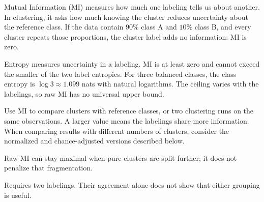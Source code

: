 \clearpage
\thispagestyle{clusteringstyle}
\label{sec:mutual-info-score}

Mutual Information (MI) measures how much one labeling tells us about another. In clustering, it asks how much knowing the cluster reduces uncertainty about the reference class. If the data contain $90\%$ class A and $10\%$ class B, and every cluster repeats those proportions, the cluster label adds no information: MI is zero.

\begin{metricformula}
\end{metricformula}

Entropy measures uncertainty in a labeling. MI is at least zero and cannot exceed the smaller of the two label entropies. For three balanced classes, the class entropy is $\log 3 \approx 1.099$ nats with natural logarithms. The ceiling varies with the labelings, so raw MI has no universal upper bound.


Use MI to compare clusters with reference classes, or two clustering runs on the same observations. A larger value means the labelings share more information. When comparing results with different numbers of clusters, consider the normalized and chance-adjusted versions described below.


{
    \item Raw MI can stay maximal when pure clusters are split further; it does not penalize that fragmentation.
    \item Requires two labelings. Their agreement alone does not show that either grouping is useful.
}


